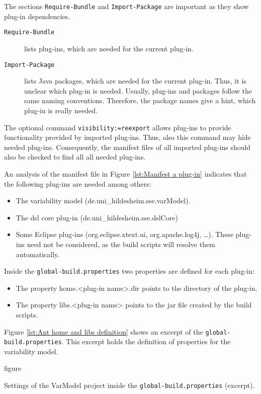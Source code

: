 The sections \texttt{Require-Bundle} and \texttt{Import-Package} are important as they show plug-in dependencies.
\begin{description}
	\item[\texttt{Require-Bundle}] lists plug-ins, which are needed for the current plug-in.
	\item[\texttt{Import-Package}] lists Java packages, which are needed for the current plug-in. Thus, it is unclear which plug-in is needed. Usually, plug-ins and packages follow the same naming conventions. Therefore, the package names give a hint, which plug-in is really needed.
\end{description}

The optional command \texttt{visibility:=reexport} allows plug-ins to provide functionality provided by imported plug-ins. Thus, also this command may hide needed plug-ins. Consequently, the manifest files of all imported plug-ins should also be checked to find all all needed plug-ins.

An analysis of the manifest file in Figure \vref{lst:Manifest a plug-in} indicates that the following plug-ins are needed among others:
\begin{itemize}
	\item The variability model (de.uni\_hildesheim.sse.varModel).
	\item The dsl core plug-in (de.uni\_hildesheim.sse.dslCore)
	\item Some Eclipse plug-ins (org.eclipse.xtext.ui, org.apache.log4j, \ldots). These plug-ins need not be considered, as the build scripts will resolve them automatically.
\end{itemize}

Inside the \texttt{global-build.properties} two properties are defined for each plug-in:
\begin{itemize}
	\item The property home.<plug-in name>.dir points to the directory of the plug-in.
	\item The property libs.<plug-in name> points to the jar file created by the build scripts.
\end{itemize}

Figure \vref{lst:Ant home and libs definition} shows an excerpt of the \texttt{global-build.properties}. This excerpt holds the definition of properties for the variability model.

\begin{nofloat}{figure}
	\centering
	
	\caption[Settings of the VarModel project inside the \texttt{global-build.properties}]{Settings of the VarModel project inside the \texttt{global-build.properties} (excerpt).}
	\label{lst:Ant home and libs definition}
\end{nofloat}

